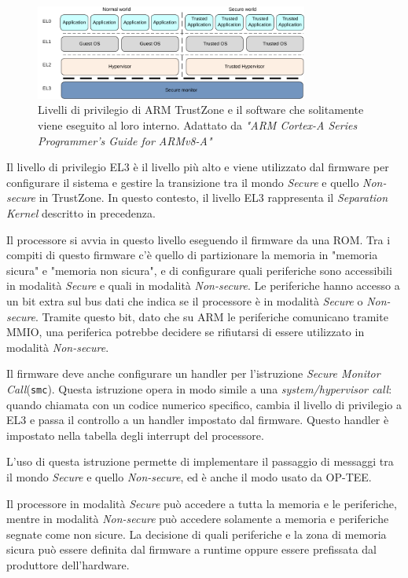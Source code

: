 \documentclass[12pt,italian]{report}
\begin{document}
\begin{figure}[h]
    \centering
    \includegraphics[width=0.8\textwidth]{immagini/aarch64-exception-levels}
    \caption{
        Livelli di privilegio di ARM TrustZone e il software
        che solitamente viene eseguito al loro interno.
        Adattato da
        \textit{"ARM Cortex-A Series Programmer's Guide for ARMv8-A"}
        \cite{arm_programmers_manual}
    }
    \label{fig:arm-exception-levels}
\end{figure}

Il livello di privilegio EL3 è il livello più alto e viene utilizzato
dal firmware per configurare il sistema e gestire la transizione
tra il mondo \emph{Secure} e quello \emph{Non-secure} in TrustZone.
In questo contesto, il livello EL3 rappresenta il
\emph{Separation Kernel} descritto in precedenza.

Il processore si avvia in questo livello eseguendo il firmware da una ROM.
Tra i compiti di questo firmware c'è quello di partizionare la memoria in
"memoria sicura" e "memoria non sicura", e di configurare quali
periferiche sono accessibili in modalità \emph{Secure} e quali
in modalità \emph{Non-secure}.
Le periferiche hanno accesso a un bit extra sul bus dati che
indica se il processore è in modalità \emph{Secure} o
\emph{Non-secure}.
Tramite questo bit, dato che su ARM le periferiche comunicano tramite MMIO,
una periferica potrebbe decidere se rifiutarsi di essere utilizzato
in modalità \emph{Non-secure}. 

Il firmware deve anche configurare un handler per l'istruzione
\textit{Secure Monitor Call}(\texttt{smc}).
Questa istruzione opera in modo simile a una \textit{system/hypervisor call}:
quando chiamata con un codice numerico specifico, cambia il livello
di privilegio a EL3 e passa il controllo a un handler impostato dal firmware.
Questo handler è impostato nella tabella degli interrupt del processore.

L'uso di questa istruzione permette di implementare il passaggio
di messaggi tra il mondo \emph{Secure} e quello \emph{Non-secure}, ed è
anche il modo usato da OP-TEE.

Il processore in modalità \emph{Secure} può accedere a tutta la memoria
e le periferiche, mentre in modalità \emph{Non-secure} può accedere
solamente a memoria e periferiche segnate come non sicure.
La decisione di quali periferiche e la zona di memoria sicura può essere
definita dal firmware a runtime oppure essere prefissata dal produttore
dell'hardware.
\end{document}
